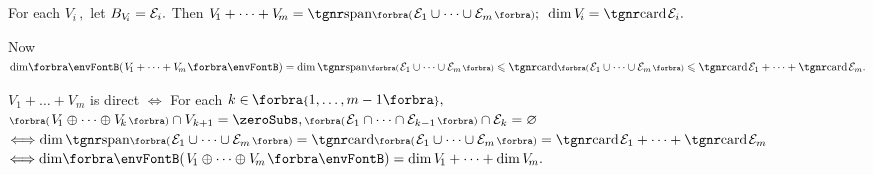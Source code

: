 For each $V_{\!i}\,,$ let $B_{V_{\!i}}=\mathcal{E}_i.$ Then $V_{\!1}+\dots+V_{\!m}=\Span[\BigPar]{\mE_1\cup\cdots\cup \mE_m};\,\,\,\dim V_{\!i}=\card\mE_i.$\par\quad
Now $\dim\!\Par{V_{\!1}+\dots+V_{\!m}}=\dim\Span[\BigPar]{\mE_1\cup\cdots\cup \mE_m}\leqslant\Card\BigPar{\mE_1\cup\cdots\cup \mE_m}\leqslant\card \mE_1+\cdots+\card \mE_m.$\par\vspace{2pt}
\ACoro $V_{\!1}+\dots+V_{\!m}$ is direct\parCor
$\Longleftrightarrow$ For each $k\in\;\!\!\Bra{1,\dots,m-1},$ $\BigPar{V_{\!1}\oplus\dots\oplus V_{\!k}}\cap V_{k+1}=\zeroSubs,\BigPar{\mE_1\cap\dots\cap\mE_{k-1}}\cap\mE_k=\emptySet$\parCor
$\Longleftrightarrow\dim\Span[\BigPar]{\mE_1\cup\dots\cup\mE_m}=\Card\BigPar{\mE_1\cup\dots\cup\mE_m}=\card\mE_1+\dots+\card\mE_m$\parCor
$\Longleftrightarrow \dim\!\Par{V_{\!1}\oplus\dots\oplus V_{\!m}}=\dim V_{\!1}+\dots+\dim V_{\!m}.$\PfEnd
\SepLine


